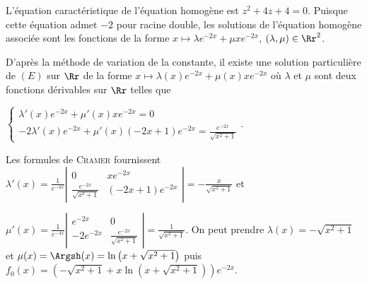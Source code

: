 {\begin{enumerate}
{L'équation caractéristique de l'équation homogène est $z^2+4z+4=0$. Puisque cette équation admet $-2$ pour racine double, les solutions de l'équation homogène associée sont les fonctions de la forme $x\mapsto\lambda e^{-2x}+\mu xe^{-2x}$, $(\lambda,\mu)\in\Rr^2$.

D'après la méthode de variation de la constante, il existe une solution particulière de $(E)$ sur $\Rr$ de la forme $x\mapsto\lambda(x)e^{-2x}+\mu(x)xe^{-2x}$ où $\lambda$ et $\mu$ sont deux fonctions dérivables sur $\Rr$ telles que 

\begin{center}
$\left\{
\begin{array}{l}
\lambda'(x)e^{-2x}+\mu'(x)xe^{-2x}=0\\
-2\lambda'(x)e^{-2x}+\mu'(x)(-2x+1)e^{-2x}= \frac{e^{-2x}}{\sqrt{x^2+1}}
\end{array}
\right.$.
\end{center}

Les formules de \textsc{Cramer} fournissent $\lambda'(x)= \frac{1}{e^{-4x}}\left|
\begin{array}{cc}
0&xe^{-2x}\\
 \frac{e^{-2x}}{\sqrt{x^2+1}}&(-2x+1)e^{-2x}
\end{array}
\right|=- \frac{x}{\sqrt{x^2+1}}$ et 

$\mu'(x)= \frac{1}{e^{-4x}}\left|
\begin{array}{cc}
e^{-2x}&0\\
-2e^{-2x}& \frac{e^{-2x}}{\sqrt{x^2+1}}
\end{array}
\right|= \frac{1}{\sqrt{x^2+1}}$. On peut prendre $\lambda(x)=-\sqrt{x^2+1}$ et $\mu(x)=\Argsh(x)=\ln\left(x+\sqrt{x^2+1}\right)$ puis $f_0(x)=\left(-\sqrt{x^2+1}+x\ln\left(x+\sqrt{x^2+1}\right)\right)e^{-2x}$.

\begin{center}
\end{center}
}
\end{enumerate}
}
